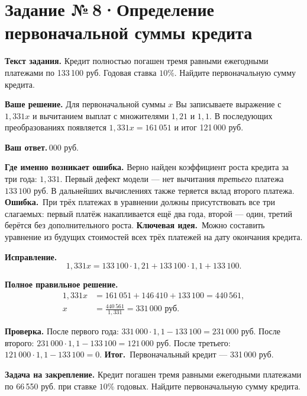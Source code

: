 \documentclass[a4paper,11pt]{article}
\newcommand{\err}{\textcolor{red!75!black}{\textbf{Ошибка.}}\ }
\newcommand{\idea}{\textcolor{accent}{\textbf{Ключевая идея.}}\ }
\newcommand{\result}{\textcolor{accent}{\textbf{Итог.}}\ }
\newcommand{\task}[2]{\clearpage\phantomsection\label{task:#1}\section*{Задание №\,#1\;·\;#2}}
\newcommand{\labelp}[1]{\par\smallskip\textbf{#1.}\enspace}
\begin{document}
\task{8}{Определение первоначальной суммы кредита}
\labelp{Текст задания} Кредит полностью погашен тремя равными ежегодными платежами по 133\,100 руб. Годовая ставка $10\%$. Найдите первоначальную сумму кредита.
\labelp{Ваше решение} Для первоначальной суммы $x$ Вы записываете выражение с $1{,}331x$ и вычитанием выплат с множителями $1{,}21$ и $1{,}1$. В последующих преобразованиях появляется $1{,}331x=161\,051$ и итог 121\,000 руб.
\labelp{Ваш ответ} 121\,000 руб.
\labelp{Где именно возникает ошибка} Верно найден коэффициент роста кредита за три года: $1{,}331$. Первый дефект модели --- нет вычитания \emph{третьего} платежа $133\,100$ руб. В дальнейших вычислениях также теряется вклад второго платежа.
\err При трёх платежах в уравнении должны присутствовать все три слагаемых: первый платёж накапливается ещё два года, второй --- один, третий берётся без дополнительного роста.
\idea Можно составить уравнение из будущих стоимостей всех трёх платежей на дату окончания кредита.
\labelp{Исправление}
\[1{,}331x=133\,100\cdot1{,}21+133\,100\cdot1{,}1+133\,100.\]
\labelp{Полное правильное решение}
\begin{align*}
1{,}331x&=161\,051+146\,410+133\,100=440\,561,\\
x&=\frac{440\,561}{1{,}331}=331\,000\text{ руб.}
\end{align*}
\labelp{Проверка} После первого года: $331\,000\cdot1{,}1-133\,100=231\,000$ руб. После второго: $231\,000\cdot1{,}1-133\,100=121\,000$ руб. После третьего: $121\,000\cdot1{,}1-133\,100=0$.
\result Первоначальный кредит --- 331\,000 руб.
\labelp{Задача на закрепление} Кредит погашен тремя равными ежегодными платежами по 66\,550 руб. при ставке $10\%$ годовых. Найдите первоначальную сумму кредита.
\end{document}
